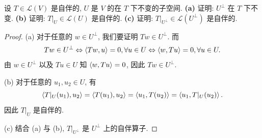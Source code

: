 \documentclass{article}
\begin{document}
\begin{problem}[7B-19]
设 $T \in \mathcal{L}(V)$ 是自伴的, $U$ 是 $V$ 的在 $T$ 下不变的子空间.
\textbf{(a)} 证明: $U^\perp$ 在 $T$ 下不变.
\textbf{(b)} 证明: $T|_U \in \mathcal{L}(U)$ 是自伴的.
\textbf{(c)} 证明: $T|_{U^\perp} \in \mathcal{L}(U^\perp)$ 是自伴的.
\end{problem}

\begin{proof}
  (a) 对于任意的 \( w\in U^\perp \), 我们要证明 \( Tw\in U^\perp \). 而
  \[ Tw\in U^\perp\Leftrightarrow \left\langle Tw, u \right\rangle=0,\forall u\in U\Leftrightarrow \left\langle w, Tu \right\rangle=0,\forall u\in U. \]
  由 \( w\in U^\perp \) 以及 \( Tu\in U \) 知 \( \left\langle w, Tu \right\rangle=0 \), 因此 \( Tw\in U^\perp \).\par
  (b) 对于任意的 \( u_1, u_2\in U \), 有
  \[ \left\langle T|_U(u_1), u_2 \right\rangle=\left\langle T(u_1), u_2 \right\rangle=\left\langle u_1, T(u_2) \right\rangle=\left\langle u_1, T|_U(u_2) \right\rangle. \]
  因此 \( T|_U \) 是自伴的.\par
  (c) 结合 (a) 与 (b), \( T|_{U^\perp} \) 是 \( U^\perp \) 上的自伴算子.
\end{proof}
\end{document}
